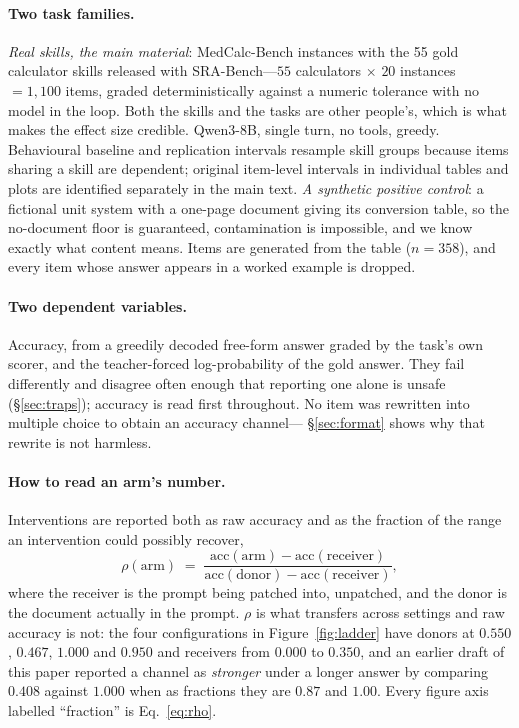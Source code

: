 \documentclass{article}
\begin{document}
\paragraph{Two task families.} \emph{Real skills, the main material}:
MedCalc-Bench instances with the 55 gold calculator skills released with
SRA-Bench---$55$ calculators $\times$ $20$ instances $= 1{,}100$ items, graded
deterministically against a numeric tolerance with no model in the loop. Both
the skills and the tasks are other people's, which is what makes the effect size
credible. Qwen3-8B, single turn, no tools, greedy. Behavioural baseline and replication
intervals resample skill groups because items sharing a skill are dependent;
original item-level intervals in individual tables and plots are identified
separately in the main text.
\emph{A synthetic positive control}: a fictional unit system with a one-page
document giving its conversion table, so the no-document floor is guaranteed,
contamination is impossible, and we know exactly what content means. Items are
generated from the table ($n=358$), and every item whose answer appears in a
worked example is dropped.

\paragraph{Two dependent variables.} Accuracy, from a greedily decoded free-form
answer graded by the task's own scorer, and the teacher-forced log-probability of
the gold answer. They fail differently and disagree often enough that reporting
one alone is unsafe (\S\ref{sec:traps}); accuracy is read first throughout. No
item was rewritten into multiple choice to obtain an accuracy channel---%
\S\ref{sec:format} shows why that rewrite is not harmless.

\paragraph{How to read an arm's number.} Interventions are reported both as raw
accuracy and as the fraction of the range an intervention could possibly
recover,
\begin{equation}
\rho(\text{arm}) \;=\;
\frac{\text{acc}(\text{arm}) - \text{acc}(\text{receiver})}
     {\text{acc}(\text{donor}) - \text{acc}(\text{receiver})},
\end{equation}
where the receiver is the prompt being patched into, unpatched, and the donor is
the document actually in the prompt. $\rho$ is what transfers across settings and
raw accuracy is not: the four configurations in Figure~\ref{fig:ladder} have
donors at $0.550$, $0.467$, $1.000$ and $0.950$ and receivers from $0.000$ to
$0.350$, and an earlier draft of this paper reported a channel as \emph{stronger}
under a longer answer by comparing $0.408$ against $1.000$ when as fractions
they are $0.87$ and $1.00$. Every figure axis labelled ``fraction'' is
Eq.~\ref{eq:rho}.
\end{document}
